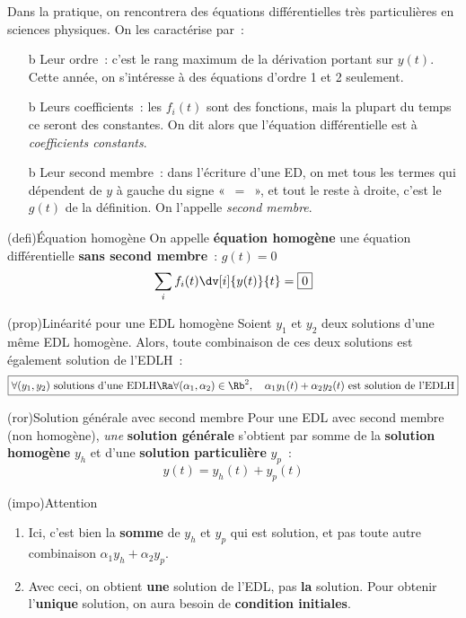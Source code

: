 \documentclass[a4paper, 11pt, garamond]{book}
\begin{document}
Dans la pratique, on rencontrera des équations différentielles très
particulières en sciences physiques. On les caractérise par~:
\begin{itemize}
	\item[b]{Leur ordre}~: c'est le rang maximum de la dérivation portant sur
	      $y(t)$. Cette année, on s'intéresse à des équations d'ordre 1 et 2 seulement.
	\item[b]{Leurs coefficients}~: les $f_i(t)$ sont des fonctions, mais la plupart
	      du temps ce seront des constantes. On dit alors que l'équation différentielle
	      est à \textit{coefficients constants}.
	\item[b]{Leur second membre}~: dans l'écriture d'une ED, on met tous les termes
	      qui dépendent de $y$ à gauche du signe «~$=$~», et tout le reste à droite,
	      c'est le $g(t)$ de la définition. On l'appelle \textit{second membre}.
\end{itemize}

\begin{tcn}(defi){Équation homogène}
	On appelle \textbf{équation homogène} une équation différentielle \textbf{sans
		second membre}~: $g(t) = 0$
	\[
		\sum_{i} f_i(t) \dv[i]{y(t)}{t} = \fbox{0}
	\]
\end{tcn}

\begin{tcb*}[label=prop:lin](prop){Linéarité pour une EDL homogène}
	Soient $y_1$ et $y_2$ deux solutions d'une même EDL homogène. Alors, toute combinaison de ces deux solutions est également
	solution de l'EDLH~:
	\[
		\boxed{
			\forall (y_1,y_2)
			\text{~solutions d'une EDLH}
			\Ra
			\forall (\alpha_1,\alpha_2) \in \Rb^{2},
			\quad \alpha_1 y_1(t) + \alpha_2 y_2(t)
			\text{~est solution de l'EDLH}
		}
	\]
\end{tcb*}

\begin{tcn}(ror){Solution générale avec second membre}
	Pour une EDL avec second membre (non homogène), \textit{une} \textbf{solution
		générale} s'obtient par somme de la \textbf{solution homogène} $y_h$ et d'une
	\textbf{solution particulière} $y_p$~:
	\[
		\boxed{y(t) = y_h(t) + y_p(t)}
	\]
\end{tcn}

\begin{tcn}(impo){Attention}
	\begin{enumerate}
		\item Ici, c'est bien la \textbf{somme} de $y_h$ et $y_p$ qui est solution,
		      et pas toute autre combinaison $\alpha_1 y_h + \alpha_2 y_p$.
		\item Avec ceci, on obtient \textbf{une} solution de l'EDL, pas \textbf{la}
		      solution. Pour obtenir l'\textbf{unique} solution, on aura besoin de
		      \textbf{condition initiales}.
	\end{enumerate}
\end{tcn}
\end{document}
